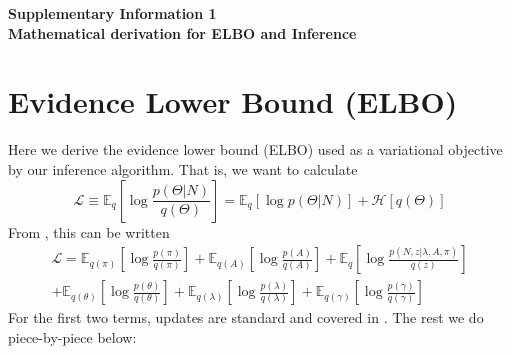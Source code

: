 \documentclass[12pt,a4paper]{article}
\date{}
\begin{document}
\vspace*{0.1in}

\begin{flushleft}
{\Large
\textbf{Supplementary Information 1 \\ Mathematical derivation for ELBO and Inference \\}
}
%
%

\section{Evidence Lower Bound (ELBO)}
Here we derive the evidence lower bound (ELBO) used as a variational objective by our inference algorithm. That is, we want to calculate
\begin{equation}
    \mathcal{L} \equiv \mathbb{E}_q \left[\log \frac{p(\Theta|N)}{q(\Theta)} \right] = \mathbb{E}_q \left[\log p(\Theta|N) \right] + \mathcal{H}[q(\Theta)]
\end{equation}
From \cite{beal2003variational}, this can be written
\begin{multline}
    \mathcal{L} = \mathbb{E}_{q(\pi)} \left[\log \frac{p(\pi)}{q(\pi)} \right]
    + \mathbb{E}_{q(A)} \left[\log \frac{p(A)}{q(A)} \right]
    + \mathbb{E}_{q}\left[ \log \frac{p(N, z|\lambda, A, \pi)}{q(z)}\right] \\
    + \mathbb{E}_{q(\theta)} \left[\log \frac{p(\theta)}{q(\theta)} \right]
    + \mathbb{E}_{q(\lambda)} \left[\log \frac{p(\lambda)}{q(\lambda)} \right]
    + \mathbb{E}_{q(\gamma)} \left[\log \frac{p(\gamma)}{q(\gamma)} \right]
\end{multline}
For the first two terms, updates are standard and covered in \cite{beal2003variational}. The rest we do piece-by-piece below:


\end{flushleft}
\end{document}
